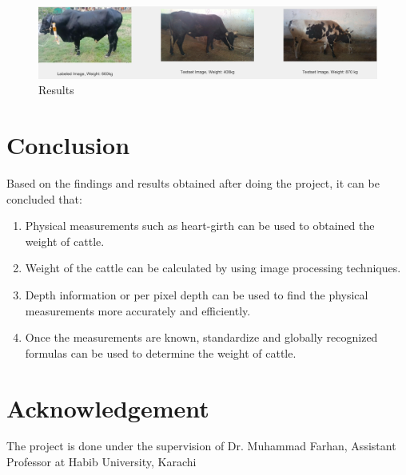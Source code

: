 \documentclass{article}
\begin{document}
\begin{figure}[h]
    \centering
    \includegraphics [scale=0.25] {result}
    \caption{Results}
    \end{figure}

\section{Conclusion}
Based on the findings and results obtained after doing the project, it can be concluded that:
\begin{enumerate}
    \item Physical measurements such as heart-girth can be used to obtained the weight of cattle.
    \item Weight of the cattle can be calculated by using image processing techniques.
    \item Depth information or per pixel depth can be used to find the physical measurements more accurately and efficiently.
    \item Once the measurements are known, standardize and globally recognized formulas can be used to determine the weight of cattle. 
\end{enumerate}
\section{Acknowledgement}
The project is done under the supervision of Dr. Muhammad Farhan, Assistant Professor at Habib University, Karachi
\end{document}
